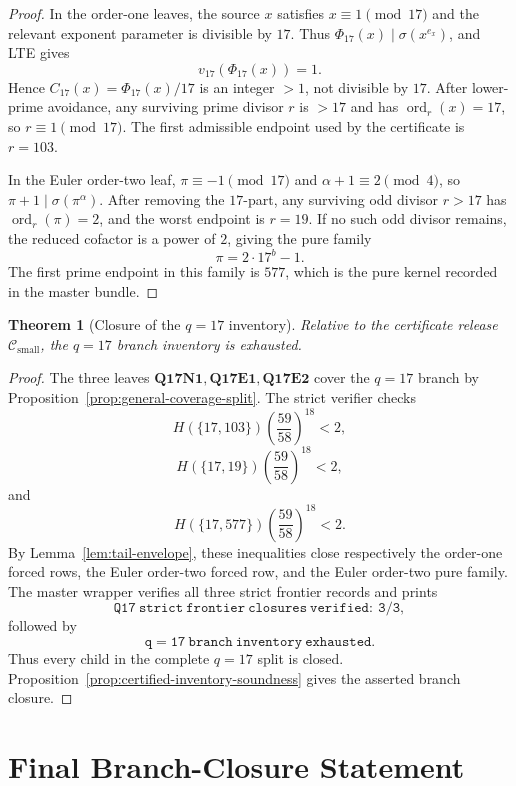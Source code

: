 \documentclass[11pt]{article}
\newtheorem{theorem}{Theorem}[section]
\theoremstyle{definition}
\theoremstyle{remark}
\DeclareMathOperator{\ord}{ord}
\newcommand{\Hfun}{H}
\newcommand{\Csmall}{\ensuremath{\mathcal C_{\mathrm{small}}}}
\begin{document}
\begin{proof}
In the order-one leaves, the source \(x\) satisfies \(x\equiv1\pmod{17}\) and
the relevant exponent parameter is divisible by \(17\).  Thus
\(\Phi_{17}(x)\mid\sigma(x^{e_x})\), and LTE gives
\[
  v_{17}(\Phi_{17}(x))=1.
\]
Hence \(C_{17}(x)=\Phi_{17}(x)/17\) is an integer \(>1\), not divisible by
\(17\).  After lower-prime avoidance, any surviving prime divisor \(r\) is
\(>17\) and has \(\ord_r(x)=17\), so \(r\equiv1\pmod{17}\).  The first
admissible endpoint used by the certificate is \(r=103\).

In the Euler order-two leaf, \(\pi\equiv-1\pmod{17}\) and
\(\alpha+1\equiv2\pmod4\), so \(\pi+1\mid\sigma(\pi^\alpha)\).  After removing
the \(17\)-part, any surviving odd divisor \(r>17\) has \(\ord_r(\pi)=2\), and
the worst endpoint is \(r=19\).  If no such odd divisor remains, the reduced
cofactor is a power of \(2\), giving the pure family
\[
  \pi=2\cdot17^b-1.
\]
The first prime endpoint in this family is \(577\), which is the pure kernel
recorded in the master bundle.
\end{proof}

\begin{theorem}[Closure of the \(q=17\) inventory]
\label{thm:q17-closed}
Relative to the certificate release \(\Csmall\), the \(q=17\) branch inventory is
exhausted.
\end{theorem}

\begin{proof}
The three leaves \(\mathbf{Q17N1},\mathbf{Q17E1},\mathbf{Q17E2}\) cover the
\(q=17\) branch by Proposition~\ref{prop:general-coverage-split}.  The strict
verifier checks
\[
  \Hfun(\{17,103\})\left(\frac{59}{58}\right)^{18}<2,
\]
\[
  \Hfun(\{17,19\})\left(\frac{59}{58}\right)^{18}<2,
\]
and
\[
  \Hfun(\{17,577\})\left(\frac{59}{58}\right)^{18}<2.
\]
By Lemma~\ref{lem:tail-envelope}, these inequalities close respectively the
order-one forced rows, the Euler order-two forced row, and the Euler order-two
pure family.  The master wrapper verifies all three strict frontier records and
prints
\[
  \mathtt{Q17\ strict\ frontier\ closures\ verified:\ 3/3},
\]
followed by
\[
  \mathtt{q=17\ branch\ inventory\ exhausted}.
\]
Thus every child in the complete \(q=17\) split is closed.
Proposition~\ref{prop:certified-inventory-soundness} gives the asserted
branch closure.
\end{proof}

\section{Final Branch-Closure Statement}
\label{sec:final}
\end{document}
